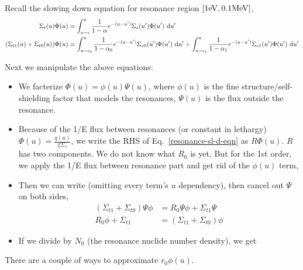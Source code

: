 \documentclass{school-22.211-notes}
\date{February 27, 2012}
\begin{document}
\maketitle

\clearpage
{}
Recall the slowing down equation for resonance region $[1\mathrm{eV}, 0.1 \mathrm{MeV}]$, 
\begin{align}
\Sigma_t (u) \Phi(u) &= \int_{u-\epsilon}^u \frac{1}{1 - \alpha} e^{-(u-u')} \Sigma_s (u') \Phi(u') \mbox{ }\mathrm{d} u' \label{resonance-sl-d-eqn} \\
(\Sigma_{t1}(u) + \Sigma_{t0} (u)) \Phi(u) &= \int_{u - \epsilon_0}^u \frac{1}{1 - \alpha_0} e^{-(u-u')} \Sigma_{s0}(u') \Phi(u') \mbox{ }\mathrm{d} u' + \int_{u-\epsilon_1}^u \frac{1}{1 - \alpha_1} e^{-(u-u')} \Sigma_{s1} (u') \Phi(u') \mbox{ }\mathrm{d} u'  
\end{align}

Next we manipulate the above equations:
\begin{itemize}
\item We facterize $\Phi(u) = \phi(u) \Psi(u)$, where $\phi(u)$ is the fine structure/self-shielding factor that models the resonances, $\Psi(u)$ is the flux outside the resonance. 

\item Because of the 1/E flux between resonances (or constant in lethargy) $\Phi(u) = \frac{q(u)}{\xi \Sigma_s}$, we write the RHS of Eq.~\ref{resonance-sl-d-eqn} as $R \Phi(u)$. $R$ has two components. We do not know what $R_0$ is yet,
But for the 1st order, we apply the 1/E flux between resonance part and get rid of the $\phi(u)$ term, 

\item Then we can write (omitting every term's $u$ dependency), then cancel out $\Psi$ on both sides, 
\begin{align}
 (\Sigma_{t1} + \Sigma_{t0}) \Psi \phi &= R_0 \Psi \phi +  \Sigma_{t1} \Psi    \\
R_0 \phi + \Sigma_{t1} &= (\Sigma_{t1}  + \Sigma_{t0} ) \phi 
\end{align}

\item If we divide by $N_0$ (the resonance nuclide number density), we get 
\end{itemize}


There are a couple of ways to approximate $r_0 \phi(u)$. 
\end{document}
